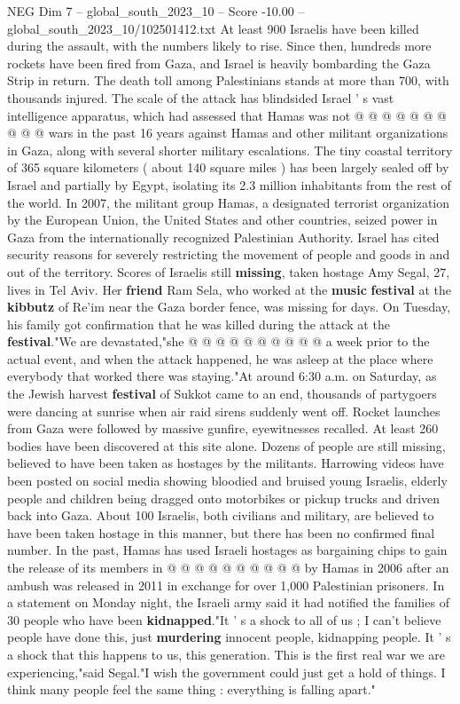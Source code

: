 \begin{textsample}{NEG Dim 7 – global\_south\_2023\_10 – Score -10.00 – global\_south\_2023\_10/102501412.txt}
At least 900 Israelis have been killed during the assault, with the numbers likely to rise.
Since then, hundreds more rockets have been fired from Gaza, and Israel is heavily bombarding the Gaza Strip in return.
The death toll among Palestinians stands at more than 700, with thousands injured.
The scale of the attack has blindsided Israel ' s vast intelligence apparatus, which had assessed that Hamas was not @ @ @ @ @ @ @ @ @ @ wars in the past 16 years against Hamas and other militant organizations in Gaza, along with several shorter military escalations.
The tiny coastal territory of 365 square kilometers ( about 140 square miles ) has been largely sealed off by Israel and partially by Egypt, isolating its 2.3 million inhabitants from the rest of the world.
In 2007, the militant group Hamas, a designated terrorist organization by the European Union, the United States and other countries, seized power in Gaza from the internationally recognized Palestinian Authority.
Israel has cited security reasons for severely restricting the movement of people and goods in and out of the territory.
Scores of Israelis still \textbf{missing}, taken hostage Amy Segal, 27, lives in Tel Aviv.
Her \textbf{friend} Ram Sela, who worked at the \textbf{music} \textbf{festival} at the \textbf{kibbutz} of Re'im near the Gaza border fence, was missing for days.
On Tuesday, his family got confirmation that he was killed during the attack at the \textbf{festival}."We are devastated,"she @ @ @ @ @ @ @ @ @ @ a week prior to the actual event, and when the attack happened, he was asleep at the place where everybody that worked there was staying."At around 6:30 a.m. on Saturday, as the Jewish harvest \textbf{festival} of Sukkot came to an end, thousands of partygoers were dancing at sunrise when air raid sirens suddenly went off.
Rocket launches from Gaza were followed by massive gunfire, eyewitnesses recalled.
At least 260 bodies have been discovered at this site alone.
Dozens of people are still missing, believed to have been taken as hostages by the militants.
Harrowing videos have been posted on social media showing bloodied and bruised young Israelis, elderly people and children being dragged onto motorbikes or pickup trucks and driven back into Gaza.
About 100 Israelis, both civilians and military, are believed to have been taken hostage in this manner, but there has been no confirmed final number.
In the past, Hamas has used Israeli hostages as bargaining chips to gain the release of its members in @ @ @ @ @ @ @ @ @ @ by Hamas in 2006 after an ambush was released in 2011 in exchange for over 1,000 Palestinian prisoners.
In a statement on Monday night, the Israeli army said it had notified the families of 30 people who have been \textbf{kidnapped}."It ' s a shock to all of us ; I can't believe people have done this, just \textbf{murdering} innocent people, kidnapping people.
It ' s a shock that this happens to us, this generation.
This is the first real war we are experiencing,"said Segal."I wish the government could just get a hold of things.
I think many people feel the same thing : everything is falling apart."


\end{textsample}

